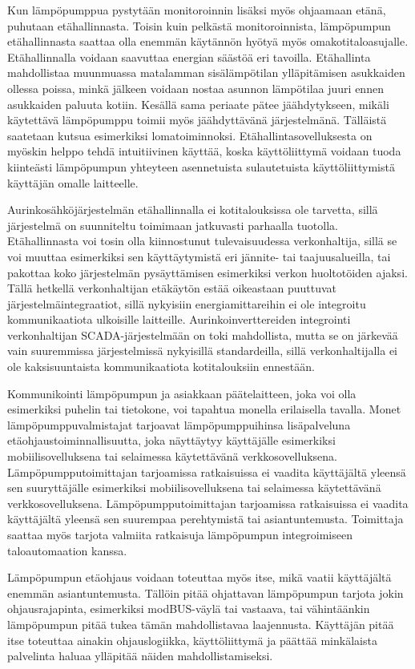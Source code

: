   Kun lämpöpumppua pystytään monitoroinnin lisäksi myös ohjaamaan etänä, puhutaan etähallinnasta. Toisin kuin pelkästä monitoroinnista, lämpöpumpun etähallinnasta saattaa olla enemmän käytännön hyötyä myös omakotitaloasujalle. Etähallinnalla voidaan saavuttaa energian säästöä eri tavoilla. Etähallinta mahdollistaa muunmuassa matalamman sisälämpötilan ylläpitämisen asukkaiden ollessa poissa, minkä jälkeen voidaan nostaa asunnon lämpötilaa juuri ennen asukkaiden paluuta kotiin. Kesällä sama periaate pätee jäähdytykseen, mikäli käytettävä lämpöpumppu toimii myös jäähdyttävänä järjestelmänä. Tälläistä saatetaan kutsua esimerkiksi lomatoiminnoksi. Etähallintasovelluksesta on myöskin helppo tehdä intuitiivinen käyttää, koska käyttöliittymä voidaan tuoda kiinteästi lämpöpumpun yhteyteen asennetuista sulautetuista käyttöliittymistä käyttäjän omalle laitteelle.

  Aurinkosähköjärjestelmän etähallinnalla ei kotitalouksissa ole tarvetta, sillä järjestelmä on suunniteltu toimimaan jatkuvasti parhaalla tuotolla. Etähallinnasta voi tosin olla kiinnostunut tulevaisuudessa verkonhaltija, sillä se voi muuttaa esimerkiksi sen käyttäytymistä eri jännite- tai taajuusalueilla, tai pakottaa koko järjestelmän pysäyttämisen esimerkiksi verkon huoltotöiden ajaksi. Tällä hetkellä verkonhaltijan etäkäytön estää oikeastaan puuttuvat järjestelmäintegraatiot, sillä nykyisiin energiamittareihin ei ole integroitu kommunikaatiota ulkoisille laitteille. Aurinkoinverttereiden integrointi verkonhaltijan \gls{SCADA}-järjestelmään on toki mahdollista, mutta se on järkevää vain suuremmissa järjestelmissä nykyisillä standardeilla, sillä verkonhaltijalla ei ole kaksisuuntaista kommunikaatiota kotitalouksiin ennestään.

  Kommunikointi lämpöpumpun ja asiakkaan päätelaitteen, joka voi olla esimerkiksi puhelin tai tietokone, voi tapahtua monella erilaisella tavalla. Monet lämpöpumppuvalmistajat tarjoavat lämpöpumppuihinsa lisäpalveluna etäohjaustoiminnallisuutta, joka näyttäytyy käyttäjälle esimerkiksi mobiilisovelluksena tai selaimessa käytettävänä verkkosovelluksena. Lämpöpumpputoimittajan tarjoamissa ratkaisuissa ei vaadita käyttäjältä yleensä sen suuryttäjälle esimerkiksi mobiilisovelluksena tai selaimessa käytettävänä verkkosovelluksena. Lämpöpumpputoimittajan tarjoamissa ratkaisuissa ei vaadita käyttäjältä yleensä sen suurempaa perehtymistä tai asiantuntemusta. Toimittaja saattaa myös tarjota valmiita ratkaisuja lämpöpumpun integroimiseen taloautomaation kanssa.

  Lämpöpumpun etäohjaus voidaan toteuttaa myös itse, mikä vaatii käyttäjältä enemmän asiantuntemusta. Tällöin pitää ohjattavan lämpöpumpun tarjota jokin ohjausrajapinta, esimerkiksi modBUS-väylä tai vastaava, tai vähintäänkin lämpöpumpun pitää tukea tämän mahdollistavaa laajennusta. Käyttäjän pitää itse toteuttaa ainakin ohjauslogiikka, käyttöliittymä ja päättää minkälaista palvelinta haluaa ylläpitää näiden mahdollistamiseksi.

